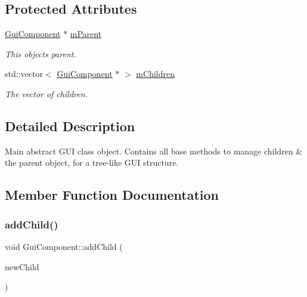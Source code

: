 \subsection*{Protected Attributes}
\begin{DoxyCompactItemize}
\item 
\mbox{\label{class_gui_component_ad25e337a93c4b506634e5766cc46ef4a}} 
\mbox{\hyperlink{class_gui_component}{Gui\+Component}} $\ast$ \mbox{\hyperlink{class_gui_component_ad25e337a93c4b506634e5766cc46ef4a}{m\+Parent}}
\begin{DoxyCompactList}\small\item\em This object\textquotesingle{}s parent. \end{DoxyCompactList}\item 
\mbox{\label{class_gui_component_a040e49b543fd6a36b1e0133a5e8dbd3d}} 
std\+::vector$<$ \mbox{\hyperlink{class_gui_component}{Gui\+Component}} $\ast$ $>$ \mbox{\hyperlink{class_gui_component_a040e49b543fd6a36b1e0133a5e8dbd3d}{m\+Children}}
\begin{DoxyCompactList}\small\item\em The vector of children. \end{DoxyCompactList}\end{DoxyCompactItemize}


\subsection{Detailed Description}
Main abstract G\+UI class object. Contains all base methods to manage children \& the parent object, for a tree-\/like G\+UI structure. 

\subsection{Member Function Documentation}
\mbox{\label{class_gui_component_a5bccaccef3d0eab8af3be84cab1300de}} 
\subsubsection{\texorpdfstring{add\+Child()}{addChild()}}
{\footnotesize\ttfamily void Gui\+Component\+::add\+Child (\begin{DoxyParamCaption}\item[{\mbox{\hyperlink{class_gui_component}{Gui\+Component}} $\ast$}]{new\+Child }\end{DoxyParamCaption})\hspace{0.3cm}{\ttfamily [virtual]}}



